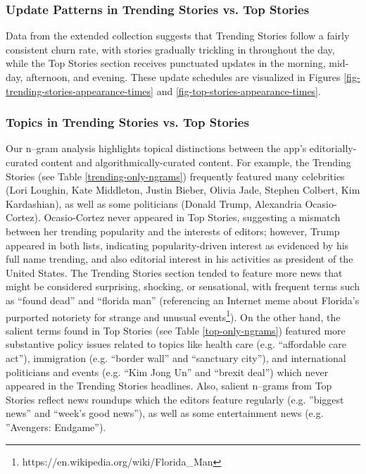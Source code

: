 \subsubsection{Update Patterns in Trending Stories vs. Top Stories}
Data from the extended collection suggests that Trending Stories follow a fairly consistent churn rate, with stories gradually trickling in throughout the day, while the Top Stories section receives punctuated updates in the morning, mid-day, afternoon, and evening. These update schedules are visualized in Figures \ref{fig-trending-stories-appearance-times} and \ref{fig-top-stories-appearance-times}.
\begin{comment}
This finding is consistent with the description in \citep{Nicas2018} of how Apple's staff updates the Top Stories: ``The lineup typically shifts five or more times a day, depending on the news. A single editor in London typically chooses the first mix of stories for the East Coast’s morning commute before editors in New York and then Cupertino step in.''
\end{comment}

\subsubsection{Topics in Trending Stories vs. Top Stories}
Our n--gram analysis highlights topical distinctions between the app's editorially-curated content and algorithmically-curated content. For example, the Trending Stories (see Table \ref{trending-only-ngrams}) frequently featured many celebrities (Lori Loughin, Kate Middleton, Justin Bieber, Olivia Jade, Stephen Colbert, Kim Kardashian), as well as some politicians (Donald Trump, Alexandria Ocasio-Cortez). Ocasio-Cortez never appeared in Top Stories, suggesting a mismatch between her trending popularity and the interests of editors; however, Trump appeared in both lists, indicating popularity-driven interest as evidenced by his full name trending, and also editorial interest in his activities as president of the United States. The Trending Stories section tended to feature more news that might be considered surprising, shocking, or sensational, with frequent terms such as ``found dead'' and ``florida man'' (referencing an Internet meme about Florida's purported notoriety for strange and unusual events\footnote{https://en.wikipedia.org/wiki/Florida\_Man}). On the other hand, the salient terms found in Top Stories (see Table \ref{top-only-ngrams}) featured more substantive policy issues related to topics like health care (e.g. ``affordable care act''), immigration (e.g. ``border wall'' and ``sanctuary city''), and international politicians and events (e.g. ``Kim Jong Un'' and ``brexit deal'') which never appeared in the Trending Stories headlines. Also, salient n--grams from Top Stories reflect news roundups which the editors feature regularly (e.g. ''biggest news'' and ``week's good news''), as well as some entertainment news (e.g. ''Avengers: Endgame'').


